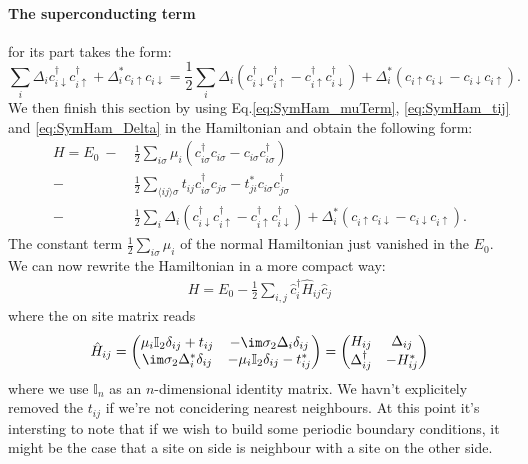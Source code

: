 \documentclass[../main.tex]{subfile}
\begin{document}
\paragraph{The superconducting term} for its part takes the form:
\begin{equation}\label{eq:SymHam_Delta}
\sum_{i} \Delta_i c_{i\downarrow}^{\dagger}c_{i\uparrow}^{\dagger} + \Delta_i^{\ast} c_{i\uparrow}c_{i\downarrow}
        = \frac{1}{2}\sum_{i} \Delta_i \left(c_{i\downarrow}^{\dagger}c_{i\uparrow}^{\dagger}-c_{i\uparrow}^{\dagger}c_{i\downarrow}^{\dagger}\right)+ \Delta_i^{\ast} \left(c_{i\uparrow}c_{i\downarrow}-c_{i\downarrow}c_{i\uparrow}\right).
\end{equation}
We then finish this section by using Eq.\ref{eq:SymHam_muTerm}, \ref{eq:SymHam_tij} and \ref{eq:SymHam_Delta} in the Hamiltonian and obtain the following form:
\begin{equation}\label{eq:Ham_Symm_Supercond_1}
    \begin{aligned}
    H = E_0 ~-~& \frac{1}{2} \sum_{i\sigma} \mu_i\left(c_{i\sigma}^{\dagger}c_{i\sigma} - c_{i\sigma}c_{i\sigma}^{\dagger}\right)\\
    -& \frac{1}{2}\sum_{\langle ij\rangle \sigma} t_{ij}c_{i\sigma}^{\dagger}c_{j\sigma} - t_{ji}^{\ast}c_{i\sigma}c_{j\sigma}^{\dagger}\\
    -& \frac{1}{2}\sum_{i} \Delta_i \left(c_{i\downarrow}^{\dagger}c_{i\uparrow}^{\dagger}-c_{i\uparrow}^{\dagger}c_{i\downarrow}^{\dagger}\right) +
    \Delta_i^{\ast} \left(c_{i\uparrow}c_{i\downarrow}-c_{i\downarrow}c_{i\uparrow}\right).
    \end{aligned}
\end{equation}
The constant term $\frac{1}{2} \sum_{i\sigma} \mu_i$ of the normal Hamiltonian just vanished in the $E_0$. 
We can now rewrite the Hamiltonian in a more compact way:
\begin{align}
    H = E_0 - \frac{1}{2}\sum_{i,j} \hat{c}_i^{\dagger} \hat{H}_{ij} \hat{c}_j  \label{eq:BdG_sys_H}
\end{align}
where the on site matrix reads
\begin{align}
    \hat{H}_{ij} = \begin{pmatrix}
        \mu_i \mathbb{I}_2 \delta_{ij} + t_{ij} & -\im\sigma_2\Delta_i \delta_{ij}\\
        \im\sigma_2\Delta^{\ast}_i \delta_{ij} & -\mu_i \mathbb{I}_2 \delta_{ij} - t_{ij}^{\ast}
    \end{pmatrix} = \begin{pmatrix}
        H_{ij} & \Delta_{ij}\\
        \Delta_{ij}^{\dagger} & -H_{ij}^{\ast}
    \end{pmatrix}    \label{eq:H^_ij} 
\end{align}
where we use $\mathbb{I}_n$ as an $n$-dimensional identity matrix. We havn't explicitely removed the 
$t_{ij}$ if we're not concidering nearest neighbours.
At this point it's intersting to note that if we wish to build some periodic boundary conditions, 
it might be the case that a site on side is neighbour with a site on the other side.\\  
\end{document}
